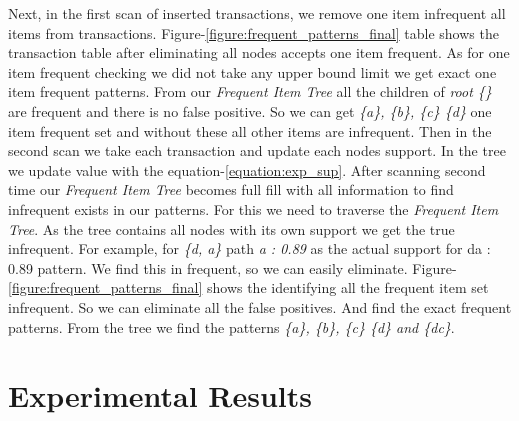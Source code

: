 \documentclass[conference]{IEEEtran}
\begin{document}
    Next, in the first scan of inserted transactions, we remove one item infrequent all items from transactions. Figure-\ref{figure:frequent_patterns_final} table shows the transaction table after eliminating all nodes accepts one item frequent. As for one item frequent checking we did not take any upper bound limit we get exact one item frequent patterns. From our \emph{Frequent Item Tree} all the children of \emph{root \{\}} are frequent and there is no false positive. So we can get \emph{\{a\}, \{b\}, \{c\} \{d\}} one item frequent set and without these all other items are infrequent.  Then in the second scan we take each transaction and update each nodes support. In the tree we update value with the equation-\ref{equation:exp_sup}. After scanning second time our \emph{Frequent Item Tree} becomes full fill with all information to find infrequent exists in our patterns. For this we need to traverse the \emph{Frequent Item Tree}. As the tree contains all nodes with its own support we get the true infrequent. For example, for \emph{\{d, a\}} path \emph{a : 0.89} as the actual support for {da : 0.89} pattern. We find this in frequent, so we can easily eliminate. Figure-\ref{figure:frequent_patterns_final} shows the identifying all the frequent item set infrequent. So we can eliminate all the false positives.    And find the exact frequent patterns. From the tree we find the patterns \emph{\{a\}, \{b\}, \{c\} \{d\} and \{dc\}}.
    





\section{Experimental Results}
\end{document}
